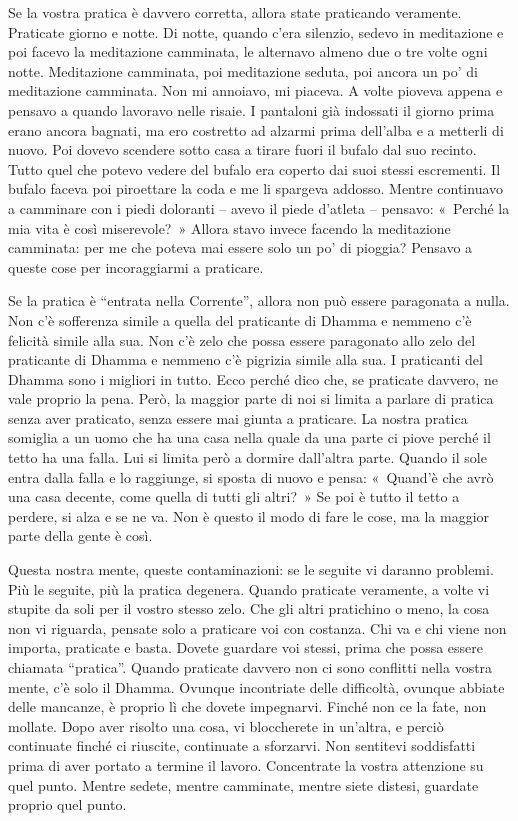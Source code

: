 Se la vostra pratica è davvero corretta, allora state praticando
veramente. Praticate giorno e notte. Di notte, quando c'era silenzio,
sedevo in meditazione e poi facevo la meditazione camminata, le
alternavo almeno due o tre volte ogni notte. Meditazione camminata, poi
meditazione seduta, poi ancora un po' di meditazione camminata. Non mi
annoiavo, mi piaceva. A volte pioveva appena e pensavo a quando lavoravo
nelle risaie. I pantaloni già indossati il giorno prima erano ancora
bagnati, ma ero costretto ad alzarmi prima dell'alba e a metterli di
nuovo. Poi dovevo scendere sotto casa a tirare fuori il bufalo dal suo
recinto. Tutto quel che potevo vedere del bufalo era coperto dai suoi
stessi escrementi. Il bufalo faceva poi piroettare la coda e me li
spargeva addosso. Mentre continuavo a camminare con i piedi doloranti --
avevo il piede d'atleta -- pensavo: «~Perché la mia vita è così
miserevole?~» Allora stavo invece facendo la meditazione camminata: per
me che poteva mai essere solo un po' di pioggia? Pensavo a queste cose
per incoraggiarmi a praticare.

Se la pratica è ``entrata nella Corrente'', allora non può essere
paragonata a nulla. Non c'è sofferenza simile a quella del praticante di
Dhamma e nemmeno c'è felicità simile alla sua. Non c'è zelo che possa
essere paragonato allo zelo del praticante di Dhamma e nemmeno c'è
pigrizia simile alla sua. I praticanti del Dhamma sono i migliori in
tutto. Ecco perché dico che, se praticate davvero, ne vale proprio la
pena. Però, la maggior parte di noi si limita a parlare di pratica senza
aver praticato, senza essere mai giunta a praticare. La nostra pratica
somiglia a un uomo che ha una casa nella quale da una parte ci piove
perché il tetto ha una falla. Lui si limita però a dormire dall'altra
parte. Quando il sole entra dalla falla e lo raggiunge, si sposta di
nuovo e pensa: «~Quand'è che avrò una casa decente, come quella di tutti
gli altri?~» Se poi è tutto il tetto a perdere, si alza e se ne va. Non
è questo il modo di fare le cose, ma la maggior parte della gente è
così.

Questa nostra mente, queste contaminazioni: se le seguite vi daranno
problemi. Più le seguite, più la pratica degenera. Quando praticate
veramente, a volte vi stupite da soli per il vostro stesso zelo. Che gli
altri pratichino o meno, la cosa non vi riguarda, pensate solo a
praticare voi con costanza. Chi va e chi viene non importa, praticate e
basta. Dovete guardare voi stessi, prima che possa essere chiamata
``pratica''. Quando praticate davvero non ci sono conflitti nella vostra
mente, c'è solo il Dhamma. Ovunque incontriate delle difficoltà, ovunque
abbiate delle mancanze, è proprio lì che dovete impegnarvi. Finché non
ce la fate, non mollate. Dopo aver risolto una cosa, vi bloccherete in
un'altra, e perciò continuate finché ci riuscite, continuate a
sforzarvi. Non sentitevi soddisfatti prima di aver portato a termine il
lavoro. Concentrate la vostra attenzione su quel punto. Mentre sedete,
mentre camminate, mentre siete distesi, guardate proprio quel punto.

